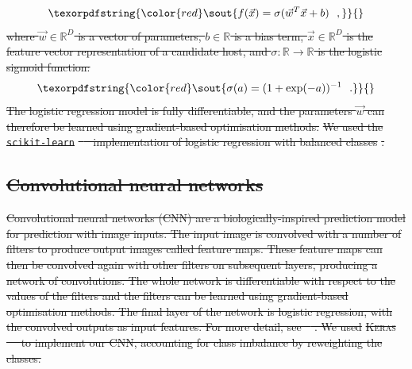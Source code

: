 \documentclass[11pt, a4paper]{book}
\providecommand{\DIFdeltex}[1]{{\protect\color{red}\sout{#1}}}                      %
\providecommand{\DIFdel}[1]{\texorpdfstring{\DIFdeltex{#1}}{}} %
\begin{document}
\begin{displaymath}
        \DIFdel{f(\vec x) = \sigma(\vec w^T \vec x + b) \,\,\,\,,
    }\end{displaymath}%
\DIFdel{where $\vec w \in \mathbb{R}^D$ is a vector of parameters, $b \in \mathbb{R}$ is a bias term, $\vec x \in \mathbb{R}^D$ is the feature vector representation of a candidate host, and $\sigma : \mathbb{R} \to \mathbb{R}$ is the logistic sigmoid function: }\begin{displaymath}
        \DIFdel{\sigma(a) = (1 + \mathrm{exp}(-a))^{-1}\,\,\,\,.
    }\end{displaymath}%
    \DIFdel{The logistic regression model is fully differentiable, and the parameters
    $\vec w$ can therefore be learned using gradient-based optimisation
    methods. }%
\DIFdel{We used the }\texttt{\DIFdel{scikit-learn}} %
\DIFdel{\mbox{%
\citep{pedregosa11sklearn}
    }\hspace{0pt}%
implementation of logistic regression with balanced classes}%
\DIFdel{.
}%

\subsection{\DIFdel{Convolutional neural networks}}
\addtocounter{subsection}{-1}%

\DIFdel{Convolutional neural networks (CNN) are a biologically-inspired prediction
    model for prediction with image inputs. The input image is convolved with
    a number of filters to produce output images called feature maps. These
    feature maps can then be convolved again with other filters on subsequent
    layers, producing a network of convolutions. The whole network is
    differentiable with respect to the values of the filters and the filters
    can be learned using gradient-based optimisation methods. The final layer
    of the network is logistic regression, with the convolved outputs as input
    features. For more detail, see \mbox{%
\citet[subsection II.A][]{lecun98}}\hspace{0pt}%
. We used
    }\textsc{\DIFdel{Keras}} %
\DIFdel{\mbox{%
\citep{chollet15keras} }\hspace{0pt}%
to implement our CNN, accounting for
    class imbalance by reweighting the classes.
}%
\end{document}
